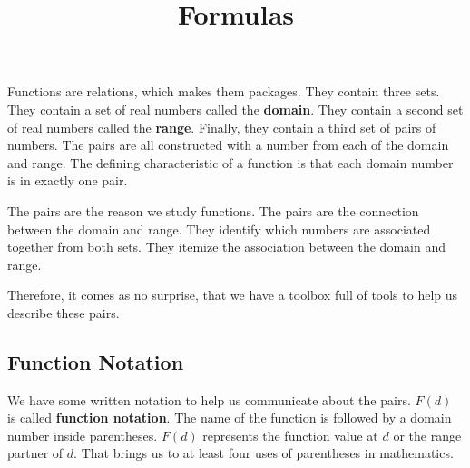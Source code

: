 \documentclass{ximera}
\title{Formulas}
\begin{document}
\begin{abstract}

\end{abstract}
\maketitle


Functions are relations, which makes them packages.  They contain three sets.  They contain a set of real numbers called the \textbf{domain}.  They contain a second set of real numbers called the \textbf{range}. Finally, they contain a third set of pairs of numbers.  The pairs are all constructed with a number from each of the domain and range. The defining characteristic of a function is that each domain number is in exactly one pair.

The pairs are the reason we study functions.  The pairs are the connection between the domain and range.  They identify which numbers are associated together from both sets. They itemize the association between the domain and range.

Therefore, it comes as no surprise, that we have a toolbox full of tools to help us describe these pairs.


\subsection*{Function Notation}

We have some written notation to help us communicate about the pairs.  $F(d)$ is called \textbf{function notation}. The name of the function is followed by a domain number inside parentheses. $F(d)$ represents the function value at $d$ or the range partner of $d$.  That brings us to at least four uses of parentheses in mathematics.
\end{document}
